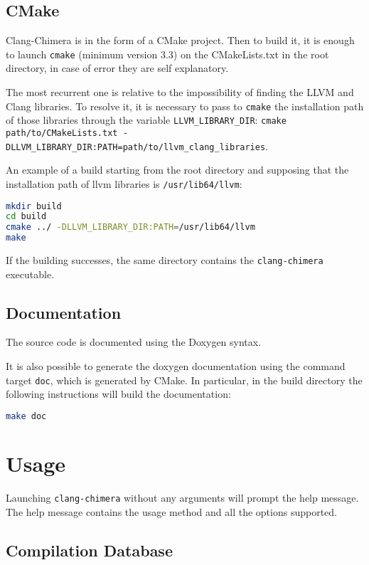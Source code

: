 \documentclass[10pt,a4paper]{article}
\begin{document}
\subsection{CMake}
Clang-Chimera is in the form of a CMake project. Then to build it, it is enough to launch \texttt{cmake} (minimum version 3.3) on the CMakeLists.txt in the root directory, in case of error they are self explanatory. 

The most recurrent one is relative to the impossibility of finding the LLVM and Clang libraries. To resolve it, it is necessary to pass to \texttt{cmake} the installation path of those libraries through the variable \texttt{LLVM\_LIBRARY\_DIR}: \texttt{cmake path/to/CMakeLists.txt -DLLVM\_LIBRARY\_DIR:PATH=path/to/llvm\_clang\_libraries}.

An example of a build starting from the root directory and supposing that the installation path of llvm libraries is \texttt{/usr/lib64/llvm}:
\begin{lstlisting}[language=bash]
mkdir build
cd build
cmake ../ -DLLVM_LIBRARY_DIR:PATH=/usr/lib64/llvm
make
\end{lstlisting}
If the building successes, the same directory contains the \texttt{clang-chimera} executable.

\subsection{Documentation}
The source code is documented using the Doxygen syntax.

It is also possible to generate the doxygen documentation using the command target \texttt{doc}, which is generated by CMake. In particular, in the build directory the following instructions will build the documentation:
\begin{lstlisting}[language=bash]
make doc
\end{lstlisting}

\section{Usage}
Launching \texttt{clang-chimera} without any arguments will prompt the help message. The help message contains the usage method and all the options supported.

\subsection{Compilation Database}
\end{document}
